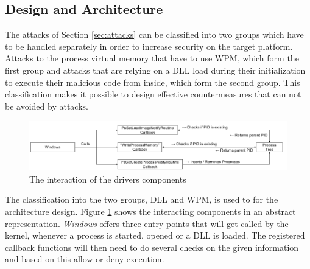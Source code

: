 \subsection{Design and Architecture}
The attacks of Section \ref{sec:attacks} can be classified into two groups which have to be handled separately in order to increase security on the target platform. Attacks to the process virtual memory that have to use \gls{WPM}, which form the first group and attacks that are relying on a \gls{DLL} load during their initialization to execute their malicious code from inside, which form the second group. This classification makes it possible to design effective countermeasures that can not be avoided by attacks.

\begin{figure}[!htbp]
\centering
\includegraphics[angle=90,scale=0.6]{sections/implementation/interaction.png}
\caption{The interaction of the drivers components}
\label{fig:interaction}
\end{figure}

The classification into the two groups, \gls{DLL} and \gls{WPM}, is used to for the architecture design. Figure \ref{fig:interaction} shows the interacting components in an abstract representation. \emph{Windows} offers three entry points that will get called by the kernel, whenever a process is started, opened or a \gls{DLL} is loaded. The registered callback functions will then need to do several checks on the given information and based on this allow or deny execution.  
